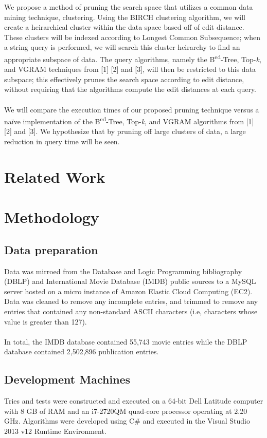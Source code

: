 \documentclass[pdftex,12pt,letter]{article}
\begin{document}
We propose a method of pruning the search space that utilizes a common data mining technique, clustering. Using the BIRCH clustering algorithm, we will create a heirarchical cluster within the data space based off of edit distance. These clusters will be indexed according to Longest Common Subsequence; when a string query is performed, we will search this cluster heirarchy to find an appropriate subspace of data. The query algorithms, namely the B\textsuperscript{ed}-Tree, Top-\textit{k}, and VGRAM techniques from [1] [2] and [3], will then be restricted to this data subspace; this effectively prunes the search space according to edit distance, without requiring that the algorithms compute the edit distances at each query. \\
\\
We will compare the execution times of our proposed pruning technique versus a na\"{i}ve implementation of the B\textsuperscript{ed}-Tree, Top-\textit{k}, and VGRAM algorithms from [1] [2] and [3]. We hypothesize that by pruning off large clusters of data, a large reduction in query time will be seen.

\section{Related Work}


\section{Methodology}
\subsection{Data preparation}
Data was mirroed from the Database and Logic Programming bibliography (DBLP) and International Movie Database (IMDB) public sources to a MySQL server hosted on a micro instance of Amazon Elastic Cloud Computing (EC2). Data was cleaned to remove any incomplete entries, and trimmed to remove any entries that contained any non-standard ASCII characters (i.e, characters whose value is greater than 127).\\
\\
In total, the IMDB database contained 55,743 movie entries while the DBLP database contained 2,502,896 publication entries.


\subsection{Development Machines}
Tries and tests were constructed and executed on a 64-bit Dell Latitude computer with 8 GB of RAM and an i7-2720QM quad-core processor operating at 2.20 GHz. Algorithms were developed using C\# and executed in the Visual Studio 2013 v12 Runtime Environment. 
\end{document}
